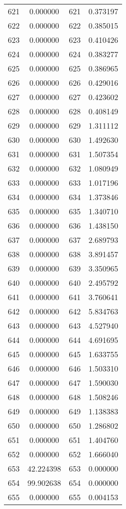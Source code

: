 \documentclass[12pt]{article}
\begin{document}
\begin{longtable}{@{}cccc@{}}
621 & 0.000000 & 621 & 0.373197 \\
622 & 0.000000 & 622 & 0.385015 \\
623 & 0.000000 & 623 & 0.410426 \\
624 & 0.000000 & 624 & 0.383277 \\
625 & 0.000000 & 625 & 0.386965 \\
626 & 0.000000 & 626 & 0.429016 \\
627 & 0.000000 & 627 & 0.423602 \\
628 & 0.000000 & 628 & 0.408149 \\
629 & 0.000000 & 629 & 1.311112 \\
630 & 0.000000 & 630 & 1.492630 \\
631 & 0.000000 & 631 & 1.507354 \\
632 & 0.000000 & 632 & 1.080949 \\
633 & 0.000000 & 633 & 1.017196 \\
634 & 0.000000 & 634 & 1.373846 \\
635 & 0.000000 & 635 & 1.340710 \\
636 & 0.000000 & 636 & 1.438150 \\
637 & 0.000000 & 637 & 2.689793 \\
638 & 0.000000 & 638 & 3.891457 \\
639 & 0.000000 & 639 & 3.350965 \\
640 & 0.000000 & 640 & 2.495792 \\
641 & 0.000000 & 641 & 3.760641 \\
642 & 0.000000 & 642 & 5.834763 \\
643 & 0.000000 & 643 & 4.527940 \\
644 & 0.000000 & 644 & 4.691695 \\
645 & 0.000000 & 645 & 1.633755 \\
646 & 0.000000 & 646 & 1.503310 \\
647 & 0.000000 & 647 & 1.590030 \\
648 & 0.000000 & 648 & 1.508246 \\
649 & 0.000000 & 649 & 1.138383 \\
650 & 0.000000 & 650 & 1.286802 \\
651 & 0.000000 & 651 & 1.404760 \\
652 & 0.000000 & 652 & 1.666040 \\
653 & 42.224398 & 653 & 0.000000 \\
654 & 99.902638 & 654 & 0.000000 \\
655 & 0.000000 & 655 & 0.004153 \\

\end{longtable}
\end{document}
